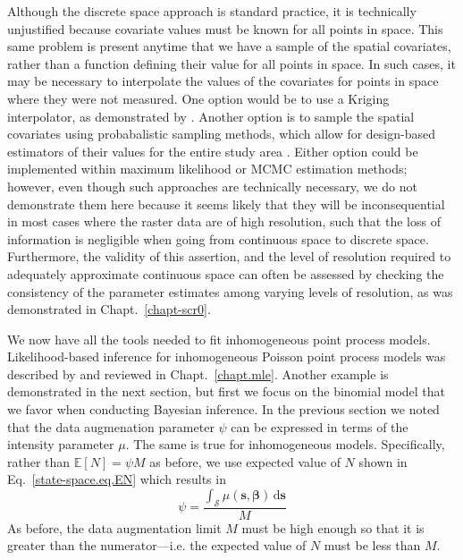 Although the discrete space approach is standard practice, it is
technically unjustified because covariate values must be known for all
points in space. This same problem is present anytime that we have a
sample of the spatial covariates, rather than a function defining
their value for all points in space. In such cases, it may be necessary to
interpolate the values of the covariates for points in space where
they were not measured. One option would be to use a Kriging
interpolator, as demonstrated by \citet{rathbun:1996}. Another option
is to sample the spatial covariates using probabalistic sampling
methods, which allow for design-based estimators of their values for
the entire study area \citep{rathbun_etal:2007}. Either option could
be implemented within maximum likelihood or MCMC estimation methods; however, even though such
approaches are technically necessary, we do not demonstrate them here
because it seems likely that they will be inconsequential in most
cases where the raster data are of high resolution, such that the loss
of information is negligible when going from continuous space to
discrete space. Furthermore, the validity of this assertion, and the
level of resolution required to adequately approximate continuous
space can often be assessed by checking the consistency of the
parameter estimates among varying levels of resolution, as was
demonstrated in Chapt.~\ref{chapt-scr0}.

We now have all the tools needed to fit inhomogeneous point process
models. Likelihood-based inference for inhomogeneous Poisson point
process models was described by \citet{borchers_efford:2008} and
reviewed in Chapt.~\ref{chapt.mle}. Another example is demonstrated in
the next section, but first we focus on the binomial
model that we favor when conducting Bayesian inference. In the
previous section we noted that the data augmenation parameter $\psi$
can be expressed in terms of the intensity parameter $\mu$. The same
is true for inhomogeneous models. Specifically, rather than
$\mathbb{E}[N] = \psi M$ as before, we use expected value of $N$ shown
in Eq.~\ref{state-space.eq.EN} which results in
\begin{equation}
\psi = \frac{\int_{\mathcal{S}} \mu(\mathbf{s},
  \bm{\beta}) \, \mathrm{d}\mathbf{s}}{M}
\label{state-space.eq.psimu}
\end{equation}
As before, the data augmentation limit $M$ must be high enough so that
it is greater than the numerator---i.e. the expected value
of $N$ must be less than $M$.

